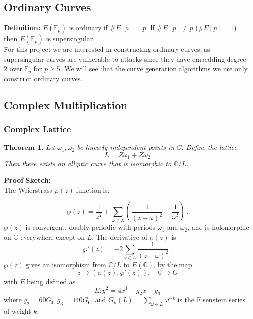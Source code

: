 \documentclass[12pt,twoside]{article}
\newtheorem{theorem}{Theorem}
\begin{document}
\subsection{Ordinary Curves}

{\bf Definition: } $E(\mathbb F_p)$ is ordinary if $\#E[p] = p$. If $\#E[p] \ne p$ ($\#E[p] = 1$) then $E(\mathbb F_p)$ is supersingular. \\


\noindent For this project we are interested in constructing ordinary curves, as supersingular curves are vulnerable to attacks since they have embedding degree $2$ over $\mathbb F_p$ for $p \geq 5$. We will see that the curve generation algorithms we use only construct ordinary curves.

\subsection{Complex Multiplication}
\subsubsection{Complex Lattice}
\begin{theorem} 
Let $\omega_{1}, \omega_{2}$ be linearly independent points in $C$.  Define the lattice 
$$ L = Z\omega_{1} + Z \omega_{2}$$ Then there exists an elliptic curve that is isomorphic to $\mathbb{C}/ L$. 
\end{theorem}
{\bf Proof Sketch:} \\

\noindent The Weierstrass $\wp (z) $ function is: 

\begin{equation} 
\wp(z) = \frac{1}{z^{2}} + \sum_{\omega \in L}\left(\frac{1}{(z-\omega)^{2}} - \frac{1}{\omega^{2}}\right) \, .
\end{equation}  
$\wp(z)$ is convergent, doubly periodic with periods $\omega_1$ and $\omega_2$, and is holomorphic on $\mathbb C$ everywhere except on $L$. The derivative of $\wp(z)$ is 
\begin{equation} 
\wp ' (z) = -2 \sum_{\omega \in L} \frac{1}{(z- \omega)^{2}} \, .
\end{equation} 
$\wp(z)$ gives an isomorphism from $\mathbb{C}/L$ to $E(\mathbb{C})$, by the map $$z \rightarrow ( \wp(z), \wp' (z)), \> \> \> \> \> 0 \rightarrow O $$ with $E$ being defined as 
\begin{equation} 
E: y^{2} = 4x^{3} - g_{2}x - g_{3} 
\end{equation} 
where $g_{2} = 60G_{4}, g_{3} = 140G_{6}$, and $G_{k}(L) = \sum_{\omega \in L}\omega^{-k}$ is the Eisenstein series of weight $k$.
\end{document}
